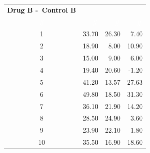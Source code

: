 \documentclass{article}
\def\B#1#2#3{\hspace*{#2}\textbf{#1}\hspace*{#3}}
\begin{document}
\begin{center}
\begin{longtable}[c]{|c|r|r|r|}
    \B{Drug B -\ Control B}{0em}{0em}\\
    \textbf{\textcolor{white}{\#}} &
    \textbf{\textcolor{white}{\#}} &
    \textbf{\textcolor{white}{\#}} &
    \textbf{\textcolor{white}{\#}}\\
    \midrule\endhead%
      1 & 33.70 & 26.30 & 7.40\\\midrule
      2 & 18.90 & 8.00 & 10.90\\\midrule
      3 & 15.00 & 9.00 & 6.00\\\midrule
      4 & 19.40 & 20.60 & -1.20\\\midrule
      5 & 41.20 & 13.57 & 27.63\\\midrule
      6 & 49.80 & 18.50 & 31.30\\\midrule
      7 & 36.10 & 21.90 & 14.20\\\midrule
      8 & 28.50 & 24.90 & 3.60\\\midrule
      9 & 23.90 & 22.10 & 1.80\\\midrule
      10 & 35.50 & 16.90 & 18.60\\
    \bottomrule
  \end{longtable}
  \begin{center}

\end{center}
\end{center}
\end{document}
